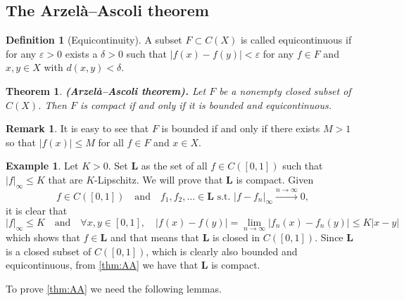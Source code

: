 \documentclass[11pt,a4paper]{article}
\theoremstyle{definition}
\newtheorem{definition}{Definition}[section]
\newtheorem{remark}{Remark}[section]
\newtheorem{example}{Example}[section]
\theoremstyle{plain}
\newtheorem{theorem}{Theorem}[section]
\newcommand{\st}{\text{ s.t. }}
\newcommand{\tand}{\quad \text{and} \quad}
\newcommand{\abs}[1]{\left\lvert #1\right\rvert}
\renewcommand{\tt}[1]{\textnormal{\textbf{(#1).}}} %
\begin{document}
  \subsection{The Arzelà–Ascoli theorem}

  \begin{definition}[Equicontinuity]
    A subset $F \subset C(X)$ is called equicontinuous if
    for any $\varepsilon > 0$ exists a $\delta > 0$ such that
    $\abs{f(x) - f(y)} < \varepsilon$ for any $f \in F$ and $x,y \in X$ with
    $d(x,y) < \delta$.
  \end{definition}
  \begin{theorem}\label{thm:AA}
    \tt{Arzelà–Ascoli theorem} Let $F$ be a nonempty closed subset of 
    $C(X)$. Then $F$ is compact if and only if it is bounded and 
    equicontinuous.
  \end{theorem}
  \begin{remark}
    It is easy to see that $F$ is bounded if and only if there exists 
    $M > 1$ so that $|f (x)| \le M$ for all $f \in F$ and $x \in X$.
  \end{remark}
  \begin{example}
    Let $K > 0$. Set $\mathbf L$ as the set of all $f \in C([0,1])$ such that 
    $\abs{f}_{\infty} \le K$ that are $K$-Lipschitz.
    We will prove that $\mathbf L$ is compact. Given
    \[
      f \in C([0,1]) \tand f_1,f_2,\dots \in \mathbf L \st
      \abs{f - f_n}_{\infty} \xrightarrow{n \to \infty} 0,
    \]
    it is clear that
    \[
      \abs{f}_{\infty} \le K \tand \forall x,y \in [0,1], \quad
      \abs{f(x) - f(y)} =
      \lim_{n \to \infty} \abs{f_n(x) - f_n(y)} \le
      K \abs{x - y}
    \]
    which shows that $f \in \mathbf L$ and that means that $\mathbf L$ is
    closed in $C([0,1])$. Since $\mathbf L$ is a closed subset of $C([0,1])$,
    which is clearly also bounded and equicontinuous, from \autoref{thm:AA}
    we have that $\mathbf L$ is compact.
  \end{example}

  To prove \autoref{thm:AA} we need the following lemmas.
\end{document}
